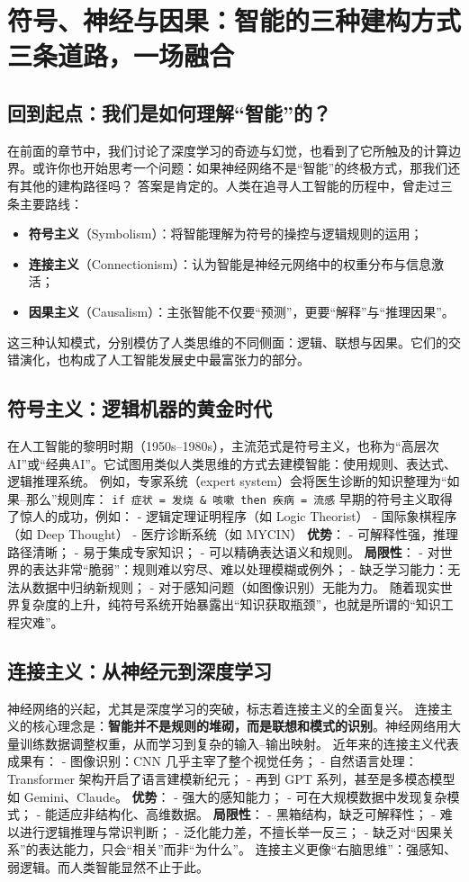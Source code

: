 \chapter{符号、神经与因果：智能的三种建构方式 \texorpdfstring{\\}{ } 三条道路，一场融合}
\section*{回到起点：我们是如何理解“智能”的？}
在前面的章节中，我们讨论了深度学习的奇迹与幻觉，也看到了它所触及的计算边界。或许你也开始思考一个问题：如果神经网络不是“智能”的终极方式，那我们还有其他的建构路径吗？
答案是肯定的。人类在追寻人工智能的历程中，曾走过三条主要路线：
\begin{itemize}
\item \textbf{符号主义}（Symbolism）：将智能理解为符号的操控与逻辑规则的运用；
\item \textbf{连接主义}（Connectionism）：认为智能是神经元网络中的权重分布与信息激活；
\item \textbf{因果主义}（Causalism）：主张智能不仅要“预测”，更要“解释”与“推理因果”。
\end{itemize}
这三种认知模式，分别模仿了人类思维的不同侧面：逻辑、联想与因果。它们的交错演化，也构成了人工智能发展史中最富张力的部分。
\section*{符号主义：逻辑机器的黄金时代}
在人工智能的黎明时期（1950s–1980s），主流范式是符号主义，也称为“高层次AI”或“经典AI”。它试图用类似人类思维的方式去建模智能：使用规则、表达式、逻辑推理系统。
例如，专家系统（expert system）会将医生诊断的知识整理为“如果–那么”规则库：
\texttt{if 症状 = 发烧 \& 咳嗽 then 疾病 = 流感}
早期的符号主义取得了惊人的成功，例如：
- 逻辑定理证明程序（如 Logic Theorist）
- 国际象棋程序（如 Deep Thought）
- 医疗诊断系统（如 MYCIN）
\textbf{优势}：
- 可解释性强，推理路径清晰；
- 易于集成专家知识；
- 可以精确表达语义和规则。
\textbf{局限性}：
- 对世界的表达非常“脆弱”：规则难以穷尽、难以处理模糊或例外；
- 缺乏学习能力：无法从数据中归纳新规则；
- 对于感知问题（如图像识别）无能为力。
随着现实世界复杂度的上升，纯符号系统开始暴露出“知识获取瓶颈”，也就是所谓的“知识工程灾难”。
\section*{连接主义：从神经元到深度学习}
神经网络的兴起，尤其是深度学习的突破，标志着连接主义的全面复兴。
连接主义的核心理念是：\textbf{智能并不是规则的堆砌，而是联想和模式的识别}。神经网络用大量训练数据调整权重，从而学习到复杂的输入–输出映射。
近年来的连接主义代表成果有：
- 图像识别：CNN 几乎主宰了整个视觉任务；
- 自然语言处理：Transformer 架构开启了语言建模新纪元；
- 再到 GPT 系列，甚至是多模态模型如 Gemini、Claude。
\textbf{优势}：
- 强大的感知能力；
- 可在大规模数据中发现复杂模式；
- 能适应非结构化、高维数据。
\textbf{局限性}：
- 黑箱结构，缺乏可解释性；
- 难以进行逻辑推理与常识判断；
- 泛化能力差，不擅长举一反三；
- 缺乏对“因果关系”的表达能力，只会“相关”而非“为什么”。
连接主义更像“右脑思维”：强感知、弱逻辑。而人类智能显然不止于此。
